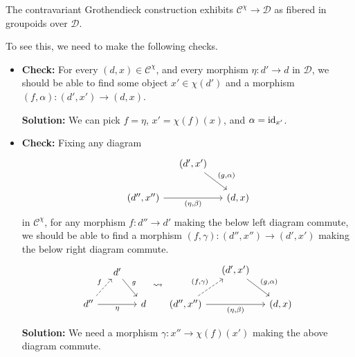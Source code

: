 \documentclass[main.tex]{subfiles}
\begin{document}
\begin{example}
  The contravariant Grothendieck construction exhibits $\mathcal{C}^{\chi} \to \mathcal{D}$ as fibered in groupoids over $\mathcal{D}$.

  To see this, we need to make the following checks.
  \begin{itemize}
    \item \textbf{Check:} For every $(d, x) \in \mathcal{C}^{\chi}$, and every morphism $\eta\colon d' \to d$ in $\mathcal{D}$, we should be able to find some object $x' \in \chi(d')$ and a morphism $(f, \alpha)\colon (d', x') \to (d, x)$.

      \textbf{Solution:} We can pick $f = \eta$, $x' = \chi(f)(x)$, and $\alpha = \mathrm{id}_{x'}$.

    \item \textbf{Check:} Fixing any diagram
      \begin{equation*}
        \begin{tikzcd}[column sep=small]
          & (d', x')
          \arrow[dr, "{(g, \alpha)}"]
          \\
          (d'', x'')
          \arrow[rr, swap, "{(\eta, \beta)}"]
          && (d, x)
        \end{tikzcd}
      \end{equation*}
      in $\mathcal{C}^{\chi}$, for any morphism $f\colon d'' \to d'$ making the below left diagram commute, we should be able to find a morphism $(f, \gamma)\colon (d'', x'') \to (d', x')$ making the below right diagram commute.
      \begin{equation*}
        \begin{tikzcd}[column sep=small]
          & d'
          \arrow[dr, "g"]
          \\
          d''
          \arrow[ur, dashed, "f"]
          \arrow[rr, swap, "\eta"]
          && d
        \end{tikzcd}
        \rightsquigarrow
        \begin{tikzcd}[column sep=small]
          & (d', x')
          \arrow[dr, "{(g, \alpha)}"]
          \\
          (d'', x'')
          \arrow[ur, dashed, "{(f, \gamma)}"]
          \arrow[rr, swap, "{(\eta, \beta)}"]
          && (d, x)
        \end{tikzcd}
      \end{equation*}

      \textbf{Solution:} We need a morphism $\gamma\colon x'' \to \chi(f)(x')$ making the above diagram commute.


\end{itemize}
\end{example}
\end{document}
